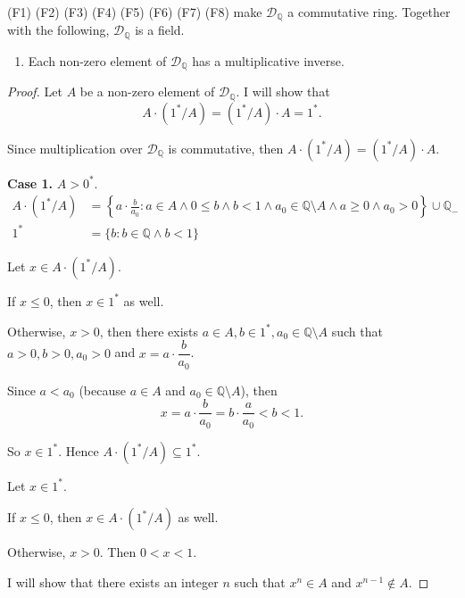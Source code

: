 (F1) (F2) (F3) (F4) (F5) (F6) (F7) (F8) make $\mathscr{D}_{\mathbb{Q}}$ a commutative ring. Together with the following, $\mathscr{D}_{\mathbb{Q}}$ is a field.

\begin{theorem}\label{theorem:chapter1:multiplicative-inverse}
    \begin{enumerate}[label={(F\arabic*)},start=9]
        \item Each non-zero element of $\mathscr{D}_{\mathbb{Q}}$ has a multiplicative inverse.
    \end{enumerate}
\end{theorem}

\begin{proof}
    Let $A$ be a non-zero element of $\mathscr{D}_{\mathbb{Q}}$. I will show that
    \[
        A\cdot ({1}^{*}/A) = ({1}^{*}/A)\cdot A = {1}^{*}.
    \]

    Since multiplication over $\mathscr{D}_{\mathbb{Q}}$ is commutative, then $A\cdot ({1}^{*}/A) = ({1}^{*}/A)\cdot A$.

    \textbf{Case 1.} $A > {0}^{*}$.
    \[
        \begin{split}
            A\cdot ({1}^{*}/A) & = \left\{ a\cdot\frac{b}{a_{0}} : a\in A\land 0\le b\land b < 1\land a_{0}\in\mathbb{Q}\setminus A\land a\ge 0\land a_{0} > 0 \right\}\cup\mathbb{Q}_{-} \\
            {1}^{*} & = \{ b: b\in\mathbb{Q}\land b < 1 \}
        \end{split}
    \]

    Let $x\in A\cdot ({1}^{*}/A)$.

    If $x\le 0$, then $x\in {1}^{*}$ as well.

    Otherwise, $x > 0$, then there exists $a\in A, b\in {1}^{*}, a_{0}\in \mathbb{Q}\setminus A$ such that $a > 0, b > 0, a_{0} > 0$ and $x = a\cdot\dfrac{b}{a_{0}}$.

    Since $a < a_{0}$ (because $a\in A$ and $a_{0}\in\mathbb{Q}\setminus A$), then
    \[
        x = a\cdot\dfrac{b}{a_{0}} = b\cdot\dfrac{a}{a_{0}} < b < 1.
    \]

    So $x\in {1}^{*}$. Hence $A\cdot ({1}^{*}/A)\subseteq {1}^{*}$.

    \bigskip

    Let $x\in {1}^{*}$.

    If $x\le 0$, then $x\in A\cdot ({1}^{*}/A)$ as well.

    Otherwise, $x > 0$. Then $0 < x < 1$.

    I will show that there exists an integer $n$ such that $x^{n}\in A$ and $x^{n-1}\notin A$.


\end{proof}

